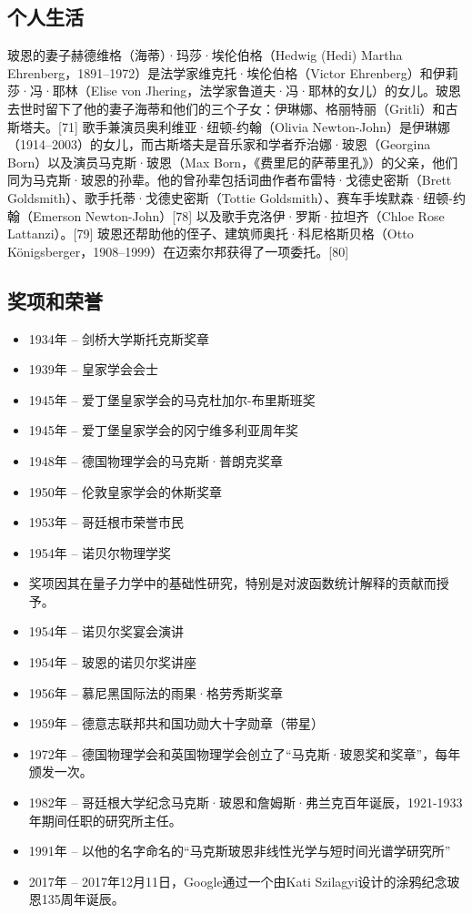 \subsection{个人生活}  
玻恩的妻子赫德维格（海蒂）·玛莎·埃伦伯格（Hedwig (Hedi) Martha Ehrenberg，1891–1972）是法学家维克托·埃伦伯格（Victor Ehrenberg）和伊莉莎·冯·耶林（Elise von Jhering，法学家鲁道夫·冯·耶林的女儿）的女儿。玻恩去世时留下了他的妻子海蒂和他们的三个子女：伊琳娜、格丽特丽（Gritli）和古斯塔夫。[71] 歌手兼演员奥利维亚·纽顿-约翰（Olivia Newton-John）是伊琳娜（1914–2003）的女儿，而古斯塔夫是音乐家和学者乔治娜·玻恩（Georgina Born）以及演员马克斯·玻恩（Max Born，《费里尼的萨蒂里孔》）的父亲，他们同为马克斯·玻恩的孙辈。他的曾孙辈包括词曲作者布雷特·戈德史密斯（Brett Goldsmith）、歌手托蒂·戈德史密斯（Tottie Goldsmith）、赛车手埃默森·纽顿-约翰（Emerson Newton-John）[78] 以及歌手克洛伊·罗斯·拉坦齐（Chloe Rose Lattanzi）。[79] 玻恩还帮助他的侄子、建筑师奥托·科尼格斯贝格（Otto Königsberger，1908–1999）在迈索尔邦获得了一项委托。[80]
\subsection{奖项和荣誉}
\begin{itemize}
\item 1934年 – 剑桥大学斯托克斯奖章  
\item 1939年 – 皇家学会会士  
\item 1945年 – 爱丁堡皇家学会的马克杜加尔-布里斯班奖  
\item 1945年 – 爱丁堡皇家学会的冈宁维多利亚周年奖  
\item 1948年 – 德国物理学会的马克斯·普朗克奖章  
\item 1950年 – 伦敦皇家学会的休斯奖章  
\item 1953年 – 哥廷根市荣誉市民  
\item 1954年 – 诺贝尔物理学奖  
  \item 奖项因其在量子力学中的基础性研究，特别是对波函数统计解释的贡献而授予。  
  \item 1954年 – 诺贝尔奖宴会演讲  
  \item 1954年 – 玻恩的诺贝尔奖讲座  
\item 1956年 – 慕尼黑国际法的雨果·格劳秀斯奖章  
\item 1959年 – 德意志联邦共和国功勋大十字勋章（带星）  
\item 1972年 – 德国物理学会和英国物理学会创立了“马克斯·玻恩奖和奖章”，每年颁发一次。  
\item 1982年 – 哥廷根大学纪念马克斯·玻恩和詹姆斯·弗兰克百年诞辰，1921-1933年期间任职的研究所主任。  
\item 1991年 – 以他的名字命名的“马克斯玻恩非线性光学与短时间光谱学研究所”  
\item 2017年 – 2017年12月11日，Google通过一个由Kati Szilagyi设计的涂鸦纪念玻恩135周年诞辰。
\end{itemize}  
